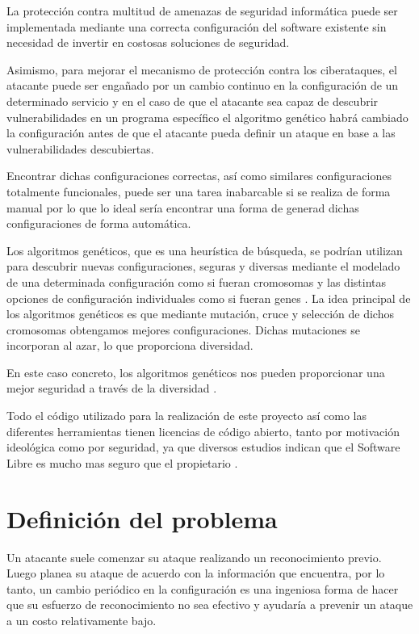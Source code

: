 \bigskip
La protección contra multitud de amenazas de seguridad informática puede ser implementada mediante una correcta configuración del software existente sin necesidad de invertir en costosas soluciones de seguridad.

\bigskip
Asimismo, para mejorar el mecanismo de protección contra los ciberataques, el atacante puede ser engañado por un cambio continuo en la configuración de un determinado servicio y en el caso de que el atacante sea capaz de descubrir vulnerabilidades en un programa específico el algoritmo genético habrá cambiado la configuración antes de que el atacante pueda definir un ataque en base a las vulnerabilidades descubiertas.

\bigskip
Encontrar dichas configuraciones correctas, así como similares configuraciones totalmente funcionales, puede ser una tarea inabarcable si se realiza de forma manual por lo que lo ideal sería encontrar una forma de generad dichas configuraciones de forma automática.

\bigskip
Los algoritmos genéticos, que es una heurística de búsqueda, se podrían utilizan para descubrir nuevas configuraciones, seguras y diversas mediante el modelado de una determinada configuración como si fueran cromosomas y las distintas opciones de configuración individuales como si fueran genes \cite{john_evolutionary_2014}. La idea principal de los algoritmos genéticos es que mediante mutación, cruce y selección de dichos cromosomas obtengamos mejores configuraciones. Dichas mutaciones se incorporan al azar, lo que proporciona diversidad.

\bigskip
En este caso concreto, los algoritmos genéticos nos pueden proporcionar una mejor seguridad a través de la diversidad \cite{crouse_improving_2012}.

\bigskip
Todo el código utilizado para la realización de este proyecto así como las diferentes herramientas tienen licencias de código abierto, tanto por motivación ideológica como por seguridad, ya que diversos estudios indican que el Software Libre es mucho mas seguro que el propietario \cite{walia_comparative_2006} \cite{mansfield-devine_open_2008} \cite{clark_is_2009}.


\section{Definición del problema}

Un atacante suele comenzar su ataque realizando un reconocimiento previo. Luego planea su ataque de acuerdo con la información que encuentra, por lo tanto, un cambio periódico en la configuración es una ingeniosa forma de hacer que su esfuerzo de reconocimiento no sea efectivo y ayudaría a prevenir un ataque a un costo relativamente bajo.

